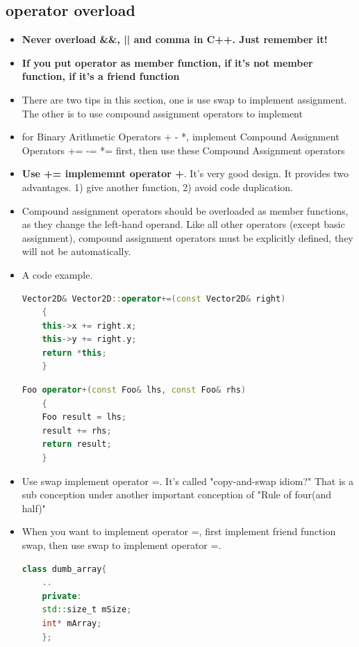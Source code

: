 \documentclass[a4paper,12pt,twoside]{book}
\begin{document}
\subsection{operator overload}
\begin{itemize}
	\item \textbf{Never overload \&\&, || and comma in C++.  Just remember it!}
	
	\item \textbf{If you put operator as member function, if it's not member function, if it's a friend function}
	
	\item There are two tips in this section, one is use swap to implement assignment. The other is to use compound assignment operators to implement 
	
	\item for Binary Arithmetic Operators + - *, implement Compound Assignment Operators += -= *= first, then use these Compound Assignment operators
	
	\item \textbf{Use += implememnt operator +}. It's very good design. It provides two advantages. 1) give another function, 2) avoid code duplication. 
	
	\item Compound assignment operators should be overloaded as member functions, as they change the left-hand operand. Like all other operators (except basic assignment), compound assignment operators must be explicitly defined, they will not be automatically.
	
	\item A code example. 
	\begin{lstlisting}[frame=single, language=c++, mathescape=true]
	Vector2D& Vector2D::operator+=(const Vector2D& right)
	{
	this->x += right.x;
	this->y += right.y;
	return *this;
	}
	\end{lstlisting}
	
	\begin{lstlisting}[frame=single, language=c++, mathescape=true]
	Foo operator+(const Foo& lhs, const Foo& rhs)
	{
	Foo result = lhs;
	result += rhs;
	return result;
	}
	\end{lstlisting}
	
	\item Use swap implement operator =. It's called "copy-and-swap idiom?" That is a sub conception under another important conception of "Rule of four(and half)"
	
	
	\item When you want to implement operator =, first implement friend function swap, then use swap to implement operator =.
	\begin{lstlisting}[frame=single, language=c++, mathescape=true]
	class dumb_array{
	..
	private:
	std::size_t mSize;
	int* mArray;
	};
	

\end{lstlisting}
\end{itemize}
\end{document}
